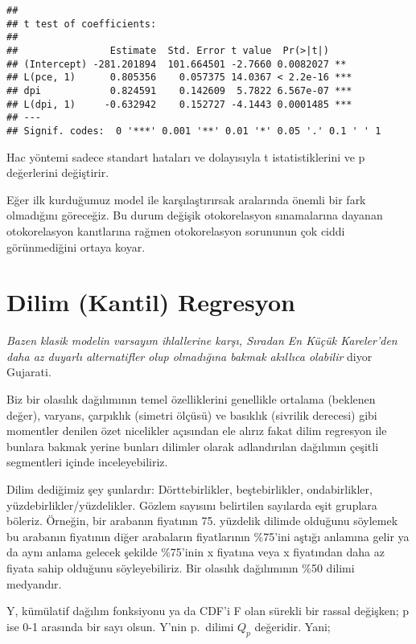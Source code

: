 \documentclass[
]{book}
\begin{document}
\begin{verbatim}
## 
## t test of coefficients:
## 
##                Estimate  Std. Error t value  Pr(>|t|)    
## (Intercept) -281.201894  101.664501 -2.7660 0.0082027 ** 
## L(pce, 1)      0.805356    0.057375 14.0367 < 2.2e-16 ***
## dpi            0.824591    0.142609  5.7822 6.567e-07 ***
## L(dpi, 1)     -0.632942    0.152727 -4.1443 0.0001485 ***
## ---
## Signif. codes:  0 '***' 0.001 '**' 0.01 '*' 0.05 '.' 0.1 ' ' 1
\end{verbatim}

Hac yöntemi sadece standart hataları ve dolayısıyla t istatistiklerini ve p değerlerini değiştirir.

Eğer ilk kurduğumuz model ile karşılaştırırsak aralarında önemli bir fark olmadığını göreceğiz. Bu durum değişik otokorelasyon sınamalarına dayanan otokorelasyon kanıtlarına rağmen otokorelasyon sorununun çok ciddi görünmediğini ortaya koyar.

\hypertarget{dilim-kantil-regresyon}{%
\chapter{Dilim (Kantil) Regresyon}\label{dilim-kantil-regresyon}}

\emph{Bazen klasik modelin varsayım ihlallerine karşı, Sıradan En Küçük Kareler'den daha az duyarlı alternatifler olup olmadığına bakmak akıllıca olabilir} diyor Gujarati.

Biz bir olasılık dağılımının temel özelliklerini genellikle ortalama (beklenen değer), varyans, çarpıklık (simetri ölçüsü) ve basıklık (sivrilik derecesi) gibi momentler denilen özet nicelikler açısından ele alırız fakat dilim regresyon ile bunlara bakmak yerine bunları dilimler olarak adlandırılan dağılımın çeşitli segmentleri içinde inceleyebiliriz.

Dilim dediğimiz şey şunlardır: Dörttebirlikler, beştebirlikler, ondabirlikler, yüzdebirlikler/yüzdelikler. Gözlem sayısını belirtilen sayılarda eşit gruplara böleriz. Örneğin, bir arabanın fiyatının 75. yüzdelik dilimde olduğunu söylemek bu arabanın fiyatının diğer arabaların fiyatlarının \%75'ini aştığı anlamına gelir ya da aynı anlama gelecek şekilde \%75'inin x fiyatına veya x fiyatından daha az fiyata sahip olduğunu söyleyebiliriz. Bir olasılık dağılımının \%50 dilimi medyandır.

Y, kümülatif dağılım fonksiyonu ya da CDF'i F olan sürekli bir rassal değişken; p ise 0-1 arasında bir sayı olsun. Y'nin p.~dilimi \(Q_p\) değeridir. Yani;
\end{document}
